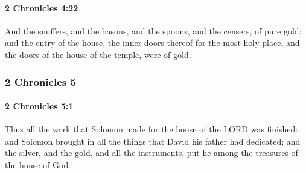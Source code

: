 		\paragraph{2 Chronicles 4:22} %
			\label{2CHRONICLES-4-22}

			And the snuffers, and the basons, and the spoons, and the censers, of pure gold: and the entry of the house, the inner doors thereof for the most holy place, and the doors of the house of the temple, were of gold.

	\subsubsection{2 Chronicles 5} %
		\label{2CHRONICLES-5}

		\paragraph{2 Chronicles 5:1} %
			\label{2CHRONICLES-5-1}

			Thus all the work that Solomon made for the house of the LORD was finished: and Solomon brought in all the things that David his father had dedicated; and the silver, and the gold, and all the instruments, put he among the treasures of the house of God.

